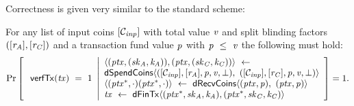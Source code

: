 Correctness is given very similar to the standard scheme:

\begin{definition}
    \label{def:ext-tx-scheme-correctness}
    For any list of input coins $[\mathcal{C}_{\mathit{inp}}]$ with total value $\mathit{v}$ and split blinding factors
    $([\mathit{r}_{\mathit{A}}], [\mathit{r}_{\mathit{C}}])$ and a transaction fund value $\mathit{p}$ with $\mathit{p} ~\leq~ \mathit{v}$ the following must hold:
    \[
        \Pr\left[
        \begin{array}{c}
            \: \mathsf{verfTx}(\mathit{tx}) ~=~ 1
        \end{array}
        \middle\vert
        \begin{array}{l}
            \langle (\mathit{ptx}, (\mathit{sk}_{\mathit{A}}, \mathit{\mathit{k}_{\mathit{A}}})), (\mathit{ptx}, (\mathit{sk}_{\mathit{C}}, \mathit{\mathit{k}_{\mathit{C}}})) \rangle ~\leftarrow~ \\
            \mathsf{dSpendCoins} \langle ([\mathcal{C}_{\mathit{inp}}],[\mathit{r}_{\mathit{A}}],\mathit{p},\mathit{v},\bot) ,~ ([\mathcal{C}_{\mathit{inp}}],[\mathit{r}_{\mathit{C}}],\mathit{p},\mathit{v},\bot) \rangle \\
            \langle (\mathit{ptx}^*, \cdot)(\mathit{ptx}^*, \cdot) \rangle ~\leftarrow~ \mathsf{dRecvCoins} \langle(\mathit{ptx},\mathit{p}) ,~ (\mathit{ptx},\mathit{p}) \rangle \\
            \mathit{tx} ~\leftarrow~ \mathsf{dFinTx} \langle(\mathit{ptx}^*,\mathit{sk}_{\mathit{A}},\mathit{\mathit{k}_{\mathit{A}}}),(\mathit{ptx}^*,\mathit{sk}_{\mathit{C}},\mathit{\mathit{k}_{\mathit{C}}})\rangle
        \end{array}
        \right]=1.
    \]
\end{definition}

